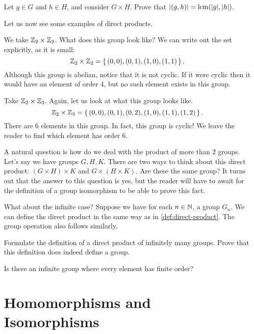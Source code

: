 \documentclass[./main.tex]{subfiles}
\begin{document}
\begin{exercise}
    Let $g \in G$ and $h \in H$, and consider $G \times H$. Prove that
    $\abs{(g,h)} = \operatorname{lcm}(\abs g, \abs h)$. 
\end{exercise}

Let us now see some examples of direct products.

\begin{example}
    We take $\mathbb{Z}_2 \times \mathbb{Z}_2$. What does this group look like? We can 
    write out the set explicitly, as it is small: 
    \[
        \mathbb{Z}_2 \times \mathbb{Z}_2 = \set{(0,0), (0,1), (1,0), (1,1)}.
    \]
    Although this group is abelian, notice that it is not cyclic. If it were
    cyclic then it would have an element of order 4, but no such element exists
    in this group.
\end{example}

\begin{example}
    Take $\mathbb{Z}_2 \times \mathbb{Z}_3$. Again, let us look at what this group looks like.
    \[
        \mathbb{Z}_2 \times \mathbb{Z}_3 = \set{(0,0), (0,1), (0,2), (1,0), (1,1), (1,2)}.
    \]
    There are 6 elements in this group. In fact, this group is cyclic! We leave
    the reader to find which element has order 6.
\end{example}

A natural question is how do we deal with the product of more than 2 groups.
Let's say we have groups $G, H, K$. There are two ways to think about this
direct product: $(G \times H) \times K$ and $G \times (H \times K)$. Are these
the same group? It turns out that the answer to this question is yes, but the
reader will have to await for the definition of a group isomorphism to be able
to prove this fact.

What about the infinite case? Suppose we have for each $n \in \mathbb{N}$, a group
$G_n$. We can define the direct product in the same way as in
\cref{def:direct-product}. The group operation also follows similarly.

\begin{exercise}
    Formulate the definition of a direct product of infinitely many groups.
    Prove that this definition does indeed define a group.
\end{exercise}

\begin{exercise}
    Is there an infinite group where every element has finite order?
\end{exercise}

\section{Homomorphisms and Isomorphisms}

\end{document}
